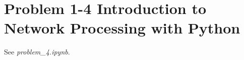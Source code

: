\section{Problem 1-4 Introduction to Network Processing with Python}

See \textit{problem\_4.ipynb}.